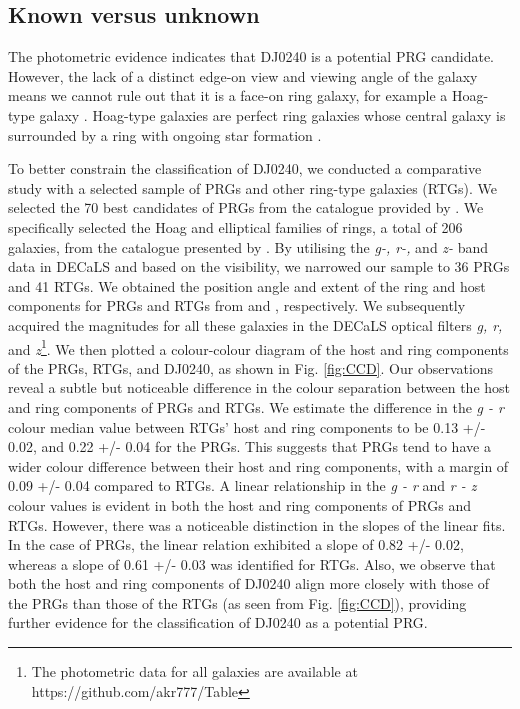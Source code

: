 \documentclass{aa}
\begin{document}
\subsection{Known versus unknown}
{The photometric evidence indicates that DJ0240 is a potential PRG candidate. However, the lack of a distinct edge-on view and viewing angle of the galaxy means we cannot rule out that it is a face-on ring galaxy, for example a Hoag-type galaxy \citep[e.g. UGC 4599;][]{2023silchenko}. Hoag-type galaxies are perfect ring galaxies whose central galaxy is surrounded by a ring with ongoing star formation \citep{1950Hoag,2013BroschHoag}.} \par
To better constrain the classification of DJ0240, we conducted a comparative study with a selected sample of PRGs and other ring-type galaxies (RTGs). We selected the 70 best candidates of PRGs from the catalogue provided by \citet{moiseev2011MNRAS.418..244M}. We specifically selected the Hoag and elliptical families of rings, a total of 206 galaxies, from the catalogue presented by \citet{1998Faundez}. By utilising the {\it g-, r-,} and {\it z-} band data in DECaLS and based on the visibility, we narrowed our sample to 36 PRGs and 41 RTGs. We obtained the position angle and extent of the ring and host components for PRGs and RTGs from \citet{2013Smirnova} and \citet{1998Faundez}, respectively. We subsequently acquired the magnitudes for all these galaxies in the DECaLS optical filters {\it g, r,} and {\it z}\footnote{\footnotesize{The photometric data for all galaxies are available at https://github.com/akr777/Table}}. We then plotted a colour-colour diagram of the host and ring components of the PRGs, RTGs, and DJ0240, as shown in Fig. \ref{fig:CCD}. Our observations reveal a subtle but noticeable difference in the colour separation between the host and ring components of PRGs and RTGs. We estimate the difference in the {\it g - r} colour median value between RTGs' host and ring components to be 0.13 +/- 0.02, and 0.22 +/- 0.04 for  the PRGs. This suggests that PRGs tend to have a wider colour difference between their host and ring components, with a margin of 0.09 +/- 0.04 compared to RTGs. A linear relationship in the  {\it g - r} and {\it r - z} colour values is evident in both the host and ring components of PRGs and RTGs. However, there was a noticeable distinction in the slopes of the linear fits. In the case of PRGs, the linear relation exhibited a slope of 0.82 +/- 0.02, whereas a slope of 0.61 +/- 0.03 was identified for RTGs. Also, we observe that both the host and ring components of DJ0240 align more closely with those of the PRGs than those of the RTGs (as seen from Fig. \ref{fig:CCD}), providing further evidence for the classification of DJ0240 as a potential PRG. 
\end{document}
